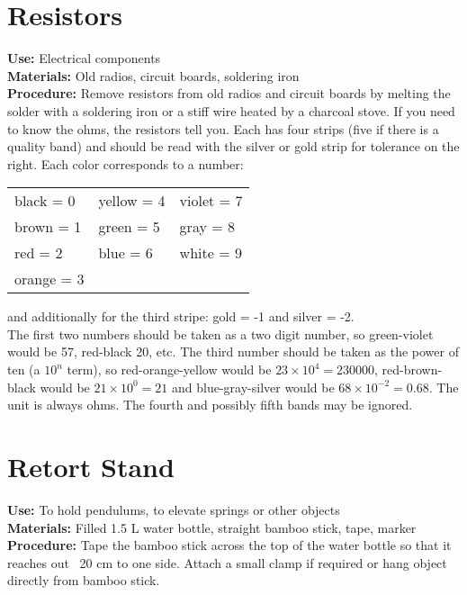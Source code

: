 \section*{Resistors}
\label{sec:resistors}
\vspace{-10pt}
\textbf{Use:} Electrical components\\
\textbf{Materials:} Old radios, circuit boards, soldering iron\\
\textbf{Procedure:} Remove resistors from old radios and circuit boards by melting the solder with a soldering iron or a stiff wire heated by a charcoal stove. If you need to know the ohms, the resistors tell you. Each has four strips (five if there is a quality band) and should be read with the silver or gold strip for tolerance on the right. Each color corresponds to a number:\\

\begin{tabular}{lll}
black = 0 & yellow = 4 & violet = 7\\
brown = 1 & green = 5 & gray = 8\\
red = 2 & blue = 6 & white = 9\\
orange = 3 & & \\[10pt]
\end{tabular} 

and additionally for the third stripe: gold = -1 and silver = -2. \\

\noindent The first two numbers should be taken as a two digit number, so green-violet would be 57, red-black 20, etc. The third number should be taken as the power of ten (a $ 10^{n} $ term), so red-orange-yellow would be $ 23 \times 10^{4} = 230000 $, red-brown-black would be $ 21 \times 10^{0} = 21 $ and blue-gray-silver would be $ 68 \times 10^{-2} = 0.68 $. The unit is always ohms. The fourth and possibly fifth bands may be ignored.

\section*{Retort Stand}
\label{sec:retort-stand}
\vspace{-10pt}
\textbf{Use:} To hold pendulums, to elevate springs or other objects\\
\textbf{Materials:} Filled 1.5 L water bottle, straight bamboo stick, tape, marker\\
\textbf{Procedure:} Tape the bamboo stick across the top of the water bottle so that it reaches out ~20 cm to one side. Attach a small clamp if required or hang object directly from bamboo stick.

